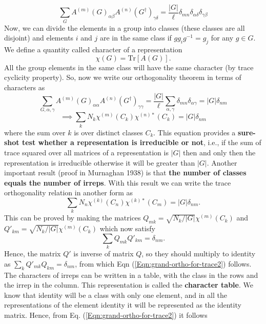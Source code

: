 \documentclass{article}
\begin{document}
\begin{equation}
	\sum_{G}A^{(m)}(G)_{\alpha \beta}  A^{(n)}(G^\dagger)_{\gamma \delta} = \frac{|G|}{\ell} \delta_{mn}\delta_{\alpha \delta} \delta_{\gamma \beta}
\end{equation}
	Now, we can divide the elements in a group into classes (these classes are all disjoint) and elements $i$ and $j$ are in the same class if $gg_i g^{-1} = g_j$ for any $g \in G$. We define a quantity called character of a representation 
	\begin{equation}
		\chi (G) = \mathrm{Tr}[A(G)].
	\end{equation}
	All the group elements in the same class will have the same character (by trace cyclicity property). So, now we write our orthogonality theorem in terms of characters as
	\begin{equation}
		\sum_{G, \alpha , \gamma}A^{(m)}(G)_{\alpha \alpha}  A^{(n)}(G^\dagger)_{\gamma \gamma} = \frac{|G|}{\ell} \sum_{\alpha , \gamma}\delta_{mn}\delta_{\alpha \gamma} = |G| \delta_{nm}
	\end{equation}
	\begin{equation}\label{Eqn:grand-ortho-for-trace1}
		\implies \sum_k N_k \chi^{(m)}(C_k)\chi^{(n)*}(C_k) = |G| \delta_{nm}
	\end{equation}
	where the sum over $k$ is over distinct classes $C_k$. This equation provides a\textbf{ sure-shot test whether a representation is irreducible or not}, i.e., if the sum of trace squared over all matrices of a representation is $|G|$ then and only then the representation is irreducible otherwise it will be greater than $|G|$. Another important result (proof in Murnaghan 1938) is that \textbf{the number of classes equals the number of irreps}. With this result we can write the trace orthogonality relation in another form as
	\begin{equation}\label{Eqn:grand-ortho-for-trace2}
		\sum_k N_n \chi^{(k)}(C_n)\chi^{(k)*}(C_m) = |G| \delta_{nm}.
	\end{equation}
	This can be proved by making the matrices $Q_{mk} = \sqrt{N_k / |G|} \chi^{(m)}(C_k)$ and $Q'_{km} = \sqrt{N_k / |G|} \chi^{(m)}(C_k)$ which now satisfy
	\begin{equation}
		\sum_k Q_{mk} Q'_{km} = \delta_{nm}.
	\end{equation}
	Hence, the matrix $Q'$ is inverse of matrix $Q$, so they should multiply to identity as $\sum_k Q'_{mk} Q_{km} = \delta_{nm}$, from which Eqn (\ref{Eqn:grand-ortho-for-trace2}) follows. The characters of irreps can be written in a table, with the class in the rows and the irrep in the column. This representation is called the \textbf{character table}. We know that identity will be a class with only one element, and in all the representations of the element identity it will be represented as the identity matrix. Hence, from Eq. (\ref{Eqn:grand-ortho-for-trace2}) it follows
\end{document}
